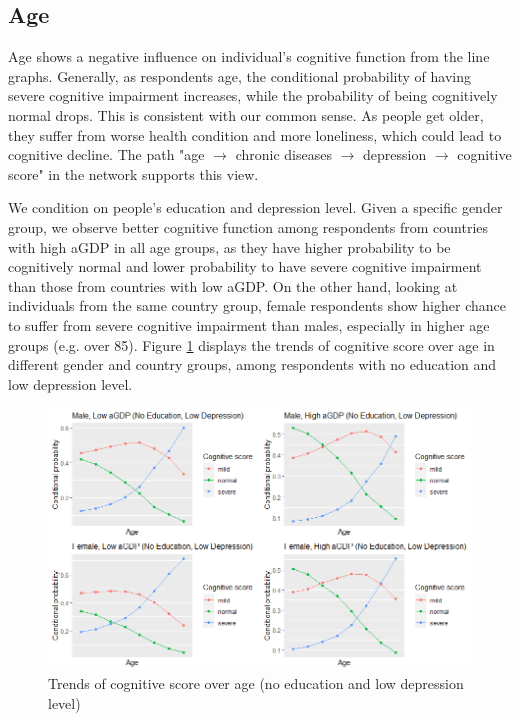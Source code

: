 \documentclass[11pt,twoside]{article}
\numberwithin{Theorem}{section}
\numberwithin{Definition}{section}
\numberwithin{Lemma}{section}
\numberwithin{Algorithm}{section}
\numberwithin{equation}{section}
\begin{document}
\subsection{Age}

Age shows a negative influence on individual's cognitive function from the line graphs. Generally, as respondents age, the conditional probability of having severe cognitive impairment increases, while the probability of being cognitively normal drops. This is consistent with our common sense. As people get older, they suffer from worse health condition and more loneliness, which could lead to cognitive decline. The path "age $\rightarrow$ chronic diseases $\rightarrow$ depression $\rightarrow$ cognitive score" in the network supports this view. 

We condition on people's education and depression level. Given a specific gender group, we observe better cognitive function among respondents from countries with high aGDP in all age groups, as they have higher probability to be cognitively normal and lower probability to have severe cognitive impairment than those from countries with low aGDP. On the other hand, looking at individuals from the same country group, female respondents show higher chance to suffer from severe cognitive impairment than males, especially in higher age groups (e.g. over 85). Figure \ref{fig:age1} displays the trends of cognitive score over age in different gender and country groups, among respondents with no education and low depression level.

\begin{figure}[!h]
	\centering
	\includegraphics[width = \textwidth]{Images/age1.png}
	\caption{Trends of cognitive score over age (no education and low depression level)}
	\label{fig:age1}
\end{figure}
\end{document}
